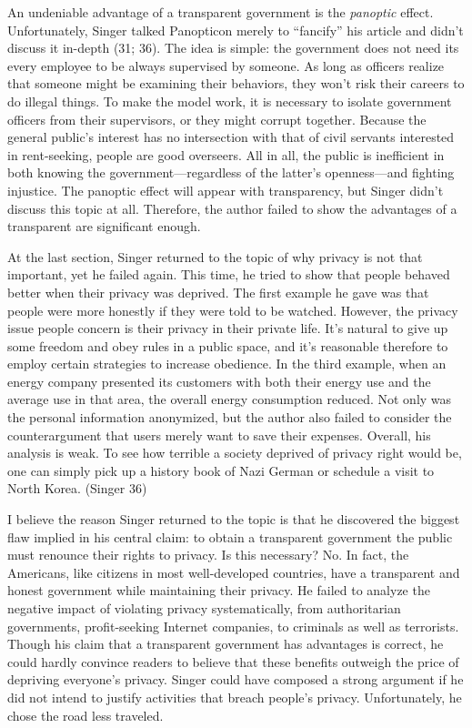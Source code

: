 \documentclass{writing}
\begin{document}
An undeniable advantage of a transparent government is the
\emph{panoptic} effect. Unfortunately, Singer talked Panopticon merely
to ``fancify'' his article and didn't discuss it in-depth (31; 36). The
idea is simple: the government does not need its every employee to be
always supervised by someone. As long as officers realize that someone
might be examining their behaviors, they won't risk their careers to do
illegal things. To make the model work, it is necessary to isolate
government officers from their supervisors, or they might corrupt
together. Because the general public's interest has no intersection with
that of civil servants interested in rent-seeking, people are good
overseers. All in all, the public is inefficient in both knowing the
government---regardless of the latter's openness---and fighting
injustice. The panoptic effect will appear with transparency, but Singer
didn't discuss this topic at all. Therefore, the author failed to show
the advantages of a transparent are significant enough.

At the last section, Singer returned to the topic of why privacy is not
that important, yet he failed again. This time, he tried to show that
people behaved better when their privacy was deprived. The first example
he gave was that people were more honestly if they were told to be
watched. However, the privacy issue people concern is their privacy in
their private life. It's natural to give up some freedom and obey rules
in a public space, and it's reasonable therefore to employ certain
strategies to increase obedience. In the third example, when an energy
company presented its customers with both their energy use and the
average use in that area, the overall energy consumption reduced. Not
only was the personal information anonymized, but the author also failed
to consider the counterargument that users merely want to save their
expenses. Overall, his analysis is weak. To see how terrible a society
deprived of privacy right would be, one can simply pick up a history
book of Nazi German or schedule a visit to North Korea. (Singer 36)

I believe the reason Singer returned to the topic is that he discovered
the biggest flaw implied in his central claim: to obtain a transparent
government the public must renounce their rights to privacy. Is this
necessary? No. In fact, the Americans, like citizens in most
well-developed countries, have a transparent and honest government while
maintaining their privacy. He failed to analyze the negative impact of
violating privacy systematically, from authoritarian governments,
profit-seeking Internet companies, to criminals as well as terrorists.
Though his claim that a transparent government has advantages is
correct, he could hardly convince readers to believe that these benefits
outweigh the price of depriving everyone's privacy. Singer could have
composed a strong argument if he did not intend to justify activities
that breach people's privacy. Unfortunately, he chose the road less
traveled.
\end{document}
